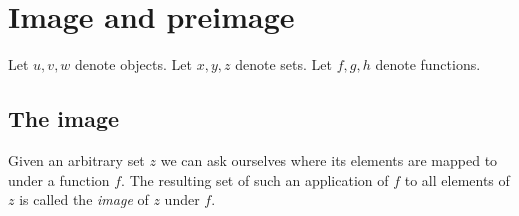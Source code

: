 \documentclass[../../set-theory.tex]{subfiles}
\begin{document}
  \section{Image and preimage}

  \begin{forthel}
  \end{forthel}

  \begin{forthel}
    Let $u,v,w$ denote objects.
    Let $x,y,z$ denote sets.
    Let $f,g,h$ denote functions.
  \end{forthel}


  \subsection{The image}

  Given an arbitrary set $z$ we can ask ourselves where its elements are mapped
  to under a function $f$.
  The resulting set of such an application of $f$ to all elements of $z$ is
  called the \textit{image} of $z$ under $f$.
\end{document}
